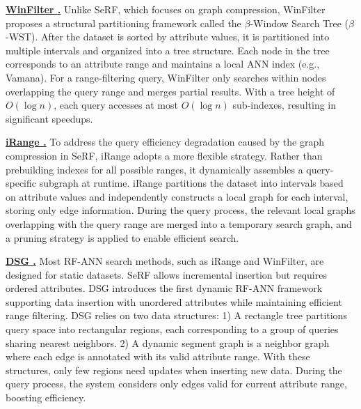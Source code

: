 \documentclass[sigconf, nonacm]{acmart}
\begin{document}
\vspace{1em}
\noindent\textbf{\underline{WinFilter \cite{winFilter}.}}  
Unlike SeRF, which focuses on graph compression, WinFilter proposes a structural partitioning framework called the $\beta$-Window Search Tree ($\beta$-WST). After the dataset is sorted by attribute values, it is partitioned into multiple intervals and organized into a tree structure. Each node in the tree corresponds to an attribute range and maintains a local ANN index (e.g., Vamana). For a range-filtering query, WinFilter only searches within nodes overlapping the query range and merges partial results. With a tree height of $O(\log n)$, each query accesses at most $O(\log n)$ sub-indexes, resulting in significant speedups.

\vspace{1em}
\noindent\textbf{\underline{iRange \cite{iRangeGraph}.}}  
To address the query efficiency degradation caused by the graph compression in SeRF, iRange adopts a more flexible strategy. Rather than prebuilding indexes for all possible ranges, it dynamically assembles a query-specific subgraph at runtime. iRange partitions the dataset into intervals based on attribute values and independently constructs a local graph for each interval, storing only edge information. During the query process, the relevant local graphs overlapping with the query range are merged into a temporary search graph, and a pruning strategy is applied to enable efficient search.

\vspace{1em}
\noindent\textbf{\underline{DSG \cite{DSG}.}}   
Most RF-ANN search methods, such as iRange and WinFilter, are designed for static datasets. SeRF allows incremental insertion but requires ordered attributes. DSG introduces the first dynamic RF-ANN framework supporting data insertion with unordered attributes while maintaining efficient range filtering.
DSG relies on two data structures: 1) A rectangle tree partitions query space into rectangular regions, each corresponding to a group of queries sharing nearest neighbors. 2) A dynamic segment graph is a neighbor graph where each edge is annotated with its valid attribute range.
With these structures, only few regions need updates when inserting new data. During the query process, the system considers only edges valid for current attribute range, boosting efficiency.
\end{document}
